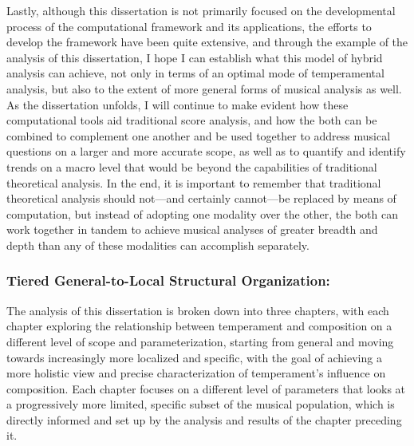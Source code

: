 Lastly, although this dissertation is not primarily focused on the
developmental process of the computational framework and its
applications, the efforts to develop the framework have been quite
extensive, and through the example of the analysis of this dissertation,
I hope I can establish what this model of hybrid analysis can achieve,
not only in terms of an optimal mode of temperamental analysis, but also
to the extent of more general forms of musical analysis as well. As the
dissertation unfolds, I will continue to make evident how these
computational tools aid traditional score analysis, and how the both can
be combined to complement one another and be used together to address
musical questions on a larger and more accurate scope, as well as to
quantify and identify trends on a macro level that would be beyond the
capabilities of traditional theoretical analysis. In the end, it is
important to remember that traditional theoretical analysis should
not---and certainly cannot---be replaced by means of
computation, but instead of adopting one modality over the other, the
both can work together in tandem to achieve musical analyses of greater
breadth and depth than any of these modalities can accomplish
separately.

\subsubsection{Tiered General-to-Local Structural
Organization:}\label{tiered-general-to-local-structural-organization}

The analysis of this dissertation is broken down into three chapters,
with each chapter exploring the relationship between temperament and
composition on a different level of scope and parameterization, starting
from general and moving towards increasingly more localized and
specific, with the goal of achieving a more holistic view and precise
characterization of temperament's influence on composition. Each chapter
focuses on a different level of parameters that looks at a progressively
more limited, specific subset of the musical population, which is
directly informed and set up by the analysis and results of the chapter
preceding it.

